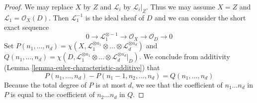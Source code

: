 \documentclass{stacks-project}
\theoremstyle{plain}
\theoremstyle{definition}
\theoremstyle{remark}
\numberwithin{equation}{subsection}
\begin{document}
\begin{proof}
We may replace $X$ by $Z$ and $\mathcal{L}_i$ by $\mathcal{L}_i|_Z$.
Thus we may assume $X = Z$ and $\mathcal{L}_1 = \mathcal{O}_X(D)$.
Then $\mathcal{L}_1^{-1}$ is the ideal sheaf of $D$ and we can
consider the short exact sequence
$$
0 \to \mathcal{L}_1^{\otimes -1} \to \mathcal{O}_X \to \mathcal{O}_D \to 0
$$
Set
$P(n_1, \ldots, n_d) =
\chi(X, \mathcal{L}_1^{\otimes n_1} \otimes \ldots \otimes
\mathcal{L}_d^{\otimes n_d})$
and
$Q(n_1, \ldots, n_d) =
\chi(D, \mathcal{L}_1^{\otimes n_1} \otimes \ldots \otimes
\mathcal{L}_d^{\otimes n_d}|_D)$.
We conclude from additivity
(Lemma \ref{lemma-euler-characteristic-additive})
that
$$
P(n_1, \ldots, n_d) - P(n_1 - 1, n_2, \ldots, n_d) =
Q(n_1, \ldots, n_d)
$$
Because the total degree of $P$ is at most $d$, we see that
the coefficient of $n_1 \ldots n_d$ in $P$ is equal to the coefficient
of $n_2 \ldots n_d$ in $Q$.
\end{proof}












\end{document}
